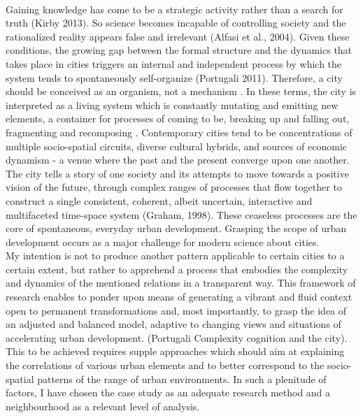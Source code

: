 \documentclass[11pt]{report}
\begin{document}
\\
Gaining knowledge has come to be a strategic activity rather than a search for truth (Kirby 2013). So science becomes incapable of controlling society and the rationalized reality appears false and irrelevant (Alfasi et al., 2004). Given these conditions, the growing gap between the formal structure and the dynamics that takes place in cities triggers an internal and independent process by which the system tends to spontaneously self-organize (Portugali 2011). Therefore, a city should be conceived as an organism, not a mechanism \href{Charles Laundry, The Creativity City}{\citealt{Charles Laundry, The Creativity City}}. In these terms, the city is interpreted as a living system which is constantly mutating and emitting new elements, a container for processes of coming to be, breaking up and falling out, fragmenting and recomposing \href{ref}{\citealt{ref}}. Contemporary cities tend to be concentrations of multiple socio-spatial circuits, diverse cultural hybrids, and sources of economic dynamism - a venue where the past and the present converge upon one another. The city tells a story of one society and its attempts to move towards a positive vision of the future, through complex ranges of processes that flow together to construct a single consistent, coherent, albeit uncertain, interactive and multifaceted time-space system (Graham, 1998). These ceaseless processes are the core of spontaneous, everyday urban development. Grasping the scope of urban development occurs as a major challenge for modern science about cities.
\\
My intention is not to produce another pattern applicable to certain cities to a certain extent, but rather to apprehend a process that embodies the complexity and dynamics of the mentioned relations in a transparent way.  This framework of research enables to ponder upon means of generating a vibrant and fluid context open to permanent transformations and, most importantly, to grasp the idea of an adjusted and balanced model, adaptive to changing views and situations of accelerating urban development. (Portugali Complexity cognition and the city). This to be achieved requires supple approaches which should aim at explaining the correlations of various urban elements and to better correspond to the socio-spatial patterns of the range of urban environments. In such a plenitude of factors, I have chosen the case study as an adequate research method and a neighbourhood as a relevant level of analysis.
\\
\end{document}
